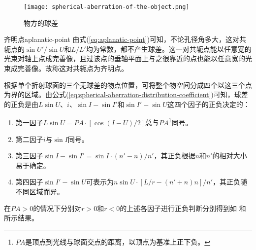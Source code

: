 \begin{figure}[htbp]
	\centering
	\texttt{[image: spherical-aberration-of-the-object.png]}
	\caption{物方的球差}
	\label{fig:spherical-aberration-of-the-object}
\end{figure}

\begin{definition}{齐明点}{aplanatic-point}
	由式(\ref{eq:aplanatic-point})可知，不论孔径角多大，这对共轭点的$\sin U'/\sin U$和$L/L'$均为常数，都不产生球差。这一对共轭点能以任意宽的光束对轴上点成完善像，且过该点的垂轴平面上与之很靠近的点也能以任意宽的光束成完善像。故称这对共轭点为齐明点。
\end{definition}

根据单个折射球面的三个无球差的物点位置，可将整个物空间分成四个以这三个点为界的区域。由公式(\ref{eq:spherical-aberration-distribution-coefficient})可知，球差的正负是由$L\sin U$、$i$、$\sin I-\sin I'$和$\sin I'-\sin U$这四个因子的正负决定的：
\begin{enumerate}
	\item 第一因子$L\sin U=PA\cdot[\cos(I-U)/2]$总与$PA$\footnote{$PA$是顶点到光线与球面交点的距离，以顶点为基准上正下负。}同号。
	\item 第二因子$i$与$\sin I$同号。
	\item 第三因子$\sin I-\sin I'=\sin I\cdot(n'-n)/n'$，其正负根据$n$和$n'$的相对大小易于确定。
	\item 第四因子$\sin I'-\sin U$可表示为$n\sin U\cdot[L/r-(n'+n)n]/n'$，其正负随不同区域而异。
\end{enumerate}
在$PA>0$的情况下分别对$r>0$和$r<0$的上述各因子进行正负判断分别得到如 和 所示结果。

\begin{table}[htbp]
	\centering
	\caption{$r>0$的球面在各区间内的球差正负}
	\label{tab:spherical-aberration-of-sphere-in-each-interval-1}
\end{table}

